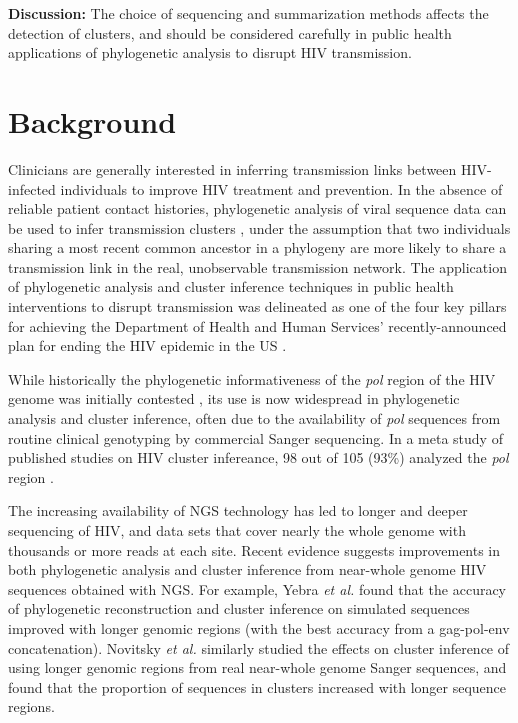 \documentclass[letterpaper]{article}
\begin{document}
\textbf{Discussion:} The choice of sequencing and summarization methods affects the detection of clusters, and should be considered carefully in public health applications of phylogenetic analysis to disrupt HIV transmission.

\section*{Background}

Clinicians are generally interested in inferring transmission links between HIV-infected individuals to improve HIV treatment and prevention. In the absence of reliable patient contact histories, phylogenetic analysis of viral sequence data can be used to infer transmission clusters \parencite{leitner}, under the assumption that two individuals sharing a most recent common ancestor in a phylogeny are more likely to share a transmission link in the real, unobservable transmission network. The application of phylogenetic analysis and cluster inference techniques in public health interventions to disrupt transmission was delineated as one of the four key pillars for achieving the Department of Health and Human Services' recently-announced plan for ending the HIV epidemic in the US \parencite{fauci}.

While historically the phylogenetic informativeness of the \emph{pol} region of the HIV genome was initially contested \parencite{hue, sturmer}, its use is now widespread in phylogenetic analysis and cluster inference, often due to the availability of \emph{pol} sequences from routine clinical genotyping by commercial Sanger sequencing. In a meta study of published studies on HIV cluster infereance, 98 out of 105 (93\%) analyzed the \emph{pol} region \cite{hassan}.

The increasing availability of NGS technology has led to longer and deeper sequencing of HIV, and data sets that cover nearly the whole genome with thousands or more reads at each site. Recent evidence suggests improvements in both phylogenetic analysis and cluster inference from near-whole genome HIV sequences obtained with NGS. For example, Yebra \emph{et al.} \parencite{yebra} found that the accuracy of phylogenetic reconstruction and cluster inference on simulated sequences improved with longer genomic regions (with the best accuracy from a gag-pol-env concatenation). Novitsky \emph{et al.} \parencite{novitsky} similarly studied the effects on cluster inference of using longer genomic regions from real near-whole genome Sanger sequences, and found that the proportion of sequences in clusters increased with longer sequence regions.
\end{document}
